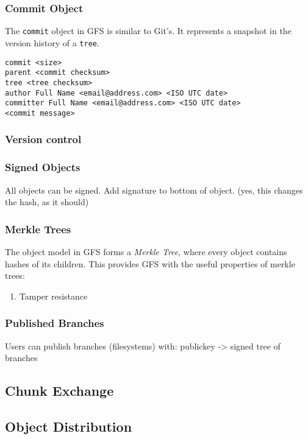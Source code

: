 \documentclass{sig-alternate}
\begin{document}
\subsubsection{Commit Object}

The \texttt{commit} object in GFS is similar to Git's. It represents a
snapshot in the version history of a \texttt{tree}.

\begin{verbatim}
commit <size>
parent <commit checksum>
tree <tree checksum>
author Full Name <email@address.com> <ISO UTC date>
committer Full Name <email@address.com> <ISO UTC date>
<commit message>
\end{verbatim}

\subsubsection{Version control}

\subsubsection{Signed Objects}

All objects can be signed. Add signature to bottom of object.
(yes, this changes the hash, as it should)

\subsubsection{Merkle Trees}

The object model in GFS forms a \textit{Merkle Tree}, where every object
contains hashes of its children. This provides GFS with the useful properties
of merkle trees:

\begin{enumerate}
  \item Tamper resistance
\end{enumerate}

\subsubsection{Published Branches}

Users can publish branches (filesystems) with:
publickey -> signed tree of branches


\subsection{Chunk Exchange}

\subsection{Object Distribution}
\end{document}
